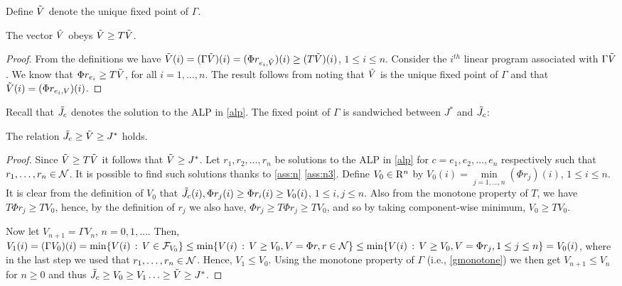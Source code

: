 \fi
Define $\tilde{V}$ denote the unique fixed point of $\Gamma$.
\begin{lemma}\label{gfp}
The vector $\tilde{V}$ obeys $\tilde{V}\geq T\tilde{V}$.
\end{lemma}
\begin{proof}
From the definitions we have $\tilde{V}(i) = (\Gamma \tilde{V})(i) = (\Phi r_{e_i,\tilde{V}})(i) \ge (T\tilde{V})(i)$, $1\le i \le n$.
Consider the $i^{th}$ linear program associated with $\Gamma \tilde{V}$. We know that $\Phi r_{e_i}\geq T \tilde{V}$, for all $i=1,\ldots, n$. The result follows from noting that $\tilde{V}$ is the unique fixed point of $\Gamma $ and that $\tilde{V}(i)=(\Phi r_{e_i,V})(i)$.
\fi
\end{proof}
Recall that $\tilde{J}_c$ denotes the solution to the ALP in \eqref{alp}.
The fixed point of $\Gamma$ is sandwiched between $J^*$ and $\tilde{J}_c$:
\begin{lemma}\label{relation1}
The relation $\tilde{J}_c\geq\tilde{V}\geq J^*$ holds.
\end{lemma}
\begin{proof}
Since $\tilde{V}\geq T\tilde{V}$ it follows that $\tilde{V}\geq J^*$. 
Let $r_1, r_2,\ldots, r_n$ be solutions to the ALP in \eqref{alp} for $c=e_1, e_2,\ldots,e_n$ respectively
such that $r_1,\dots,r_n\in \mathcal{N}$. It is possible to find such solutions thanks to \cref{ass:n} \eqref{ass:n3}.
Define $V_0\in \mathrm{R}^n$ by $V_0(i)=\underset{j=1,\ldots, n}{\min}(\Phi r_j)(i)$, $1\le i \le n$. 
It is clear from the definition of $V_0$ that $\tilde{J}_c(i), \Phi r_j(i) \geq\Phi r_i(i)\geq V_0(i)$, $1\le i,j \le n$. 
Also from the monotone property of $T$, we have $T\Phi r_j\geq T V_0$,
hence, by the definition of $r_j$ we also have,
$\Phi r_j\geq T\Phi r_j \geq T V_0$, 
and so by taking component-wise minimum,
$V_0 \geq T V_0$.

Now let $V_{n+1} = \Gamma V_n$, $n=0,1,\dots$. Then, $V_1(i) = (\Gamma V_0)(i) = \min\{ V(i) \,:\, V\in \mathcal{F}_{V_0} \}
\le \min\{ V(i) \,:\, V\ge V_0, V = \Phi r, r\in \mathcal{N} \} \le \min\{ V(i)\,:\, V \ge V_0, V = \Phi r_j, 1\le j \le n \} = V_0(i)$,
where in the last step we used that $r_1,\dots,r_n \in \mathcal{N}$.
Hence, $V_1 \le V_0$. Using the monotone property of $\Gamma$ (i.e., \cref{gmonotone})
we then get $V_{n+1}\le V_n$ for $n\ge 0$ and thus 
$\tilde{J}_c\geq V_0\geq V_1\ldots\geq \tilde{V} \geq J^*$.
\end{proof}

